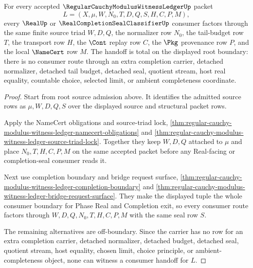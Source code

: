\begin{theorem}
\label{thm:regular-cauchy-modulus-witness-ledger-root-consumer-handoff-totality}
For every accepted $\RegularCauchyModulusWitnessLedgerUp$ packet
$$
L=(X,\mu,W,N_0,T,D,Q,S,H,C,P,M),
$$
every $\RealUp$ or $\RealCompletionSealClassifierUp$ consumer factors through the same finite source triad $W,D,Q$, the normalizer row $N_0$, the tail-budget row $T$, the transport row $H$, the $\Cont$ replay row $C$, the $\Pkg$ provenance row $P$, and the local $\NameCert$ row $M$. The handoff is total on the displayed root boundary: there is no consumer route through an extra completion carrier, detached normalizer, detached tail budget, detached seal, quotient stream, host real equality, countable choice, selected limit, or ambient completeness coordinate.
\end{theorem}
\begin{proof}
Start from root source admission above. It identifies the admitted source rows as $\mu,W,D,Q,S$ over the displayed source and structural packet rows.

Apply the NameCert obligations and source-triad lock, \autoref{thm:regular-cauchy-modulus-witness-ledger-namecert-obligations} and \autoref{thm:regular-cauchy-modulus-witness-ledger-source-triad-lock}. Together they keep $W,D,Q$ attached to $\mu$ and place $N_0,T,H,C,P,M$ on the same accepted packet before any Real-facing or completion-seal consumer reads it.

Next use completion boundary and bridge request surface, \autoref{thm:regular-cauchy-modulus-witness-ledger-completion-boundary} and \autoref{thm:regular-cauchy-modulus-witness-ledger-bridge-request-surface}. They make the displayed tuple the whole consumer boundary for Phase Real and Completion exit, so every consumer route factors through $W,D,Q,N_0,T,H,C,P,M$ with the same seal row $S$.

The remaining alternatives are off-boundary. Since the carrier has no row for an extra completion carrier, detached normalizer, detached budget, detached seal, quotient stream, host equality, chosen limit, choice principle, or ambient-completeness object, none can witness a consumer handoff for $L$.
\end{proof}

